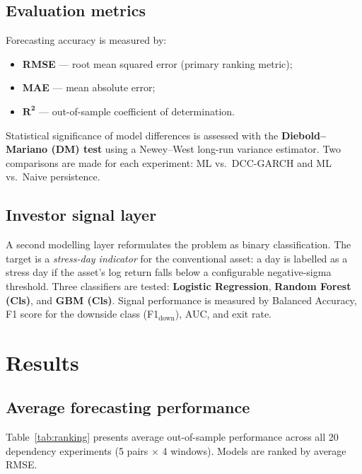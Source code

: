 \documentclass[12pt, a4paper]{article}
\begin{document}
\subsection{Evaluation metrics}

Forecasting accuracy is measured by:
\begin{itemize}[noitemsep]
  \item \textbf{RMSE} — root mean squared error (primary ranking metric);
  \item \textbf{MAE} — mean absolute error;
  \item $\boldsymbol{R^2}$ — out-of-sample coefficient of determination.
\end{itemize}

Statistical significance of model differences is assessed with
the \textbf{Diebold--Mariano (DM) test} using a
Newey--West long-run variance estimator.
Two comparisons are made for each experiment:
ML vs.\ DCC-GARCH and ML vs.\ Naive persistence.

\subsection{Investor signal layer}

A second modelling layer reformulates the problem as binary
classification. The target is a \emph{stress-day indicator}
for the conventional asset: a day is labelled as a stress day
if the asset's log return falls below a configurable
negative-sigma threshold.
Three classifiers are tested: \textbf{Logistic Regression},
\textbf{Random Forest (Cls)}, and \textbf{GBM (Cls)}.
Signal performance is measured by Balanced Accuracy,
F1 score for the downside class (F1$_{\text{down}}$),
AUC, and exit rate.

\section{Results}

\subsection{Average forecasting performance}

Table~\ref{tab:ranking} presents average out-of-sample performance
across all 20 dependency experiments (5 pairs $\times$ 4 windows).
Models are ranked by average RMSE.
\end{document}
